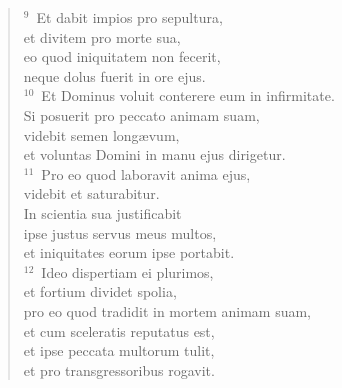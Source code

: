 \begin{flushleft}
\begin{verse}
${}^{9}$~Et dabit impios pro sepultura,\\ et divitem pro morte sua,\\ eo quod iniquitatem non fecerit,\\ neque dolus fuerit in ore ejus.\\
${}^{10}$~Et Dominus voluit conterere eum in infirmitate.\\ Si posuerit pro peccato animam suam,\\ videbit semen long\ae vum,\\ et voluntas Domini in manu ejus dirigetur.\\
${}^{11}$~Pro eo quod laboravit anima ejus,\\ videbit et saturabitur.\\ In scientia sua justificabit\\ ipse justus servus meus multos,\\ et iniquitates eorum ipse portabit.\\
${}^{12}$~Ideo dispertiam ei plurimos,\\ et fortium dividet spolia,\\ pro eo quod tradidit in mortem animam suam,\\ et cum sceleratis reputatus est,\\ et ipse peccata multorum tulit,\\ et pro transgressoribus rogavit.\end{verse}\end{flushleft}


